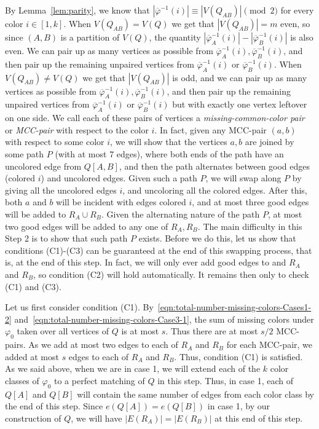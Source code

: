 \documentclass[11pt, oneside]{article}
\newcommand{\pbar}{\overline{\varphi}}
\begin{document}
By Lemma~\ref{lem:parity}, we know that $|\pbar^{-1}(i)| \equiv |V(Q_{AB})|\pmod{2}$   for every color $i\in [1,k]$. When $V(Q_{AB})=V(Q)$ we get that $|V(Q_{AB})|=m$ even, so since $(A, B)$ is a partition of $V(Q)$, the quantity $|\pbar^{-1}_A(i)|-|\pbar^{-1}_B(i)|$ is also even. We can pair up as many vertices as possible from $\pbar^{-1}_A(i),\pbar^{-1}_B(i)$, and then pair up 
the remaining unpaired vertices from  $\pbar^{-1}_A(i)$ or $\pbar^{-1}_B(i)$.  
When $V(Q_{AB})\neq V(Q)$ we get that $|V(Q_{AB})|$ is odd, and we can pair up as many vertices as possible from $\pbar^{-1}_A(i),\pbar^{-1}_B(i)$, and then pair up 
the remaining unpaired vertices from  $\pbar^{-1}_A(i)$ or $\pbar^{-1}_B(i)$ 
but with exactly one vertex leftover on one side. 
We call each of these pairs of vertices a \emph{missing-common-color pair} or \emph{MCC-pair} with respect to the color $i$. In fact, given any MCC-pair $(a,b)$ with respect to some color $i$, we will show that the vertices $a, b$ are joined by some path $P$ (with at most 7 edges), where both ends of the path have an uncolored edge from $Q[A, B]$, and then the path alternates between good edges (colored $i$) and uncolored edges. Given such a path $P$, we will swap along $P$ by giving all the uncolored edges $i$, and uncoloring all the colored edges. After this, both $a$ and $b$ will be incident with edges colored $i$, and at most three good edges will be added to $R_A\cup R_B$. Given the alternating nature of the path $P$, at most two good edges will be added to any one of $R_A, R_B$.
The main difficulty in this Step 2 is to show that such path $P$ exists. Before we do this, let us show that conditions (C1)-(C3) can be guaranteed at the end of this swapping process, that is, at the end of this step. In fact, 
we will only ever add good edges to and $R_A$ and $R_B$, so condition (C2) will  hold automatically.  It remains then only to check (C1) and (C3).



Let us first consider condition (C1).  By~\eqref{eqn:total-number-missing-colors-Cases1-2} and~\eqref{eqn:total-number-missing-colors-Case3-1}, 
the sum of
missing colors  under $\varphi_0$ taken over all vertices of $Q$ is at most  $s$. 
Thus there are at most   $s/2$ MCC-pairs. As we add at most two edges to each of $R_A$ and $R_B$ for each MCC-pair,   we added at most $s$ edges to each of $R_A$
and $R_B$.  Thus, condition (C1) is satisfied. 
As we said above, when we are in case 1, we will extend each of the $k$ color classes of $\varphi_0$ to a perfect matching of $Q$ in this step. Thus, in case 1,
each of $Q[A]$ and $Q[B]$ will contain the same number of edges from each color class by the end of this step. Since $e(Q[A])=e(Q[B])$ in case 1, by our construction of $Q$, we will have $|E(R_A)|= |E(R_B)|$ at this end of this step.
\end{document}
